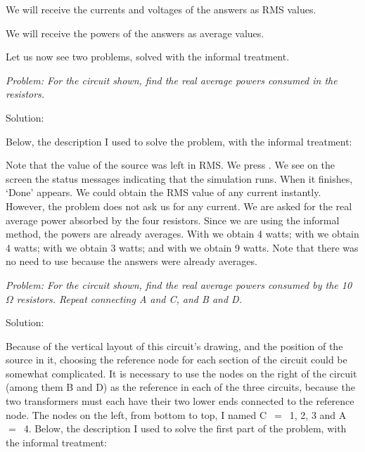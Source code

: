 We will receive the currents and voltages of the answers as RMS
values.

We will receive the powers of the answers as average values.

Let us now see two problems, solved with the informal treatment.


\emph{Problem: For the circuit shown, find the real average powers
consumed in the resistors.}

Solution:

Below, the description I used to solve the problem, with the
informal treatment:


Note that the value of the source was left in RMS. We press
. We see on the screen the status messages indicating
that the simulation runs. When it finishes, `Done' appears. We could
obtain the RMS value of any current instantly. However, the problem
does not ask us for any current. We are asked for the real average
power absorbed by the four resistors. Since we are using the
informal method, the powers are already averages. With
 we obtain 4 watts; with  we obtain
4 watts; with  we obtain 3 watts; and with
 we obtain 9 watts. Note that there was no need to
use  because the answers were already averages.


\emph{Problem: For the circuit shown, find the real average powers
consumed by the 10~$\Omega$ resistors. Repeat connecting A and C,
and B and D.}

Solution:

Because of the vertical layout of this circuit's drawing, and the
position of the source in it, choosing the reference node for each
section of the circuit could be somewhat complicated. It is
necessary to use the nodes on the right of the circuit (among them B
and D) as the reference in each of the three circuits, because the
two transformers must each have their two lower ends connected to
the reference node. The nodes on the left, from bottom to top, I
named C~$=$~1, 2, 3 and A~$=$~4. Below, the description I used to
solve the first part of the problem, with the informal treatment:



